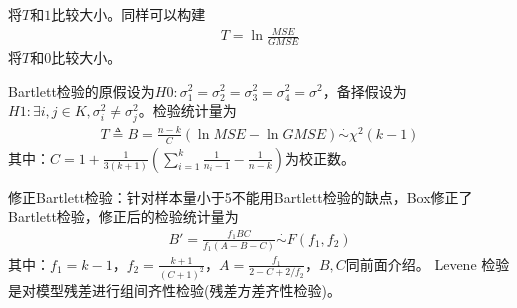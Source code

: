         将$T$和$1$比较大小。同样可以构建
        \begin{align*}
        T = \ln \frac{MSE}{GMSE}
        \end{align*}
        将$T$和$0$比较大小。
        \par
        Bartlett检验的原假设为$H0:\sigma_1^2=\sigma_2^2=\sigma_3^2=\sigma_4^2=\sigma^2$，备择假设为$H1:\exists i,j\in K,\sigma_i^2 \neq \sigma_j^2$。检验统计量为
        \begin{align*}
        T \triangleq B = \frac{n-k}{C} \left( \ln MSE- \ln GMSE \right) \overset{\cdot}{\sim} \chi^2(k-1)
        \end{align*}
        其中：$C = 1+\frac{1}{3(k+1)} \left( \sum\limits_{i=1}^k\frac{1}{n_i-1} -\frac{1}{n-k} \right) $为校正数。
        \par
        修正Bartlett检验：针对样本量小于5不能用Bartlett检验的缺点，Box修正了Bartlett检验，修正后的检验统计量为
        \begin{align*}
        B' = \frac{f_1 B C}{f_1 (A-B-C)} \overset{\cdot}{\sim} F(f_1,f_2)
        \end{align*}
        其中：$f_1 = k-1$，$f_2 = \frac{k+1}{(C+1)^2}$，$A = \frac{f_1}{2-C+2/f_2}$，$B,C$同前面介绍。
        Levene 检验是对模型残差进行组间齐性检验(残差方差齐性检验)。


